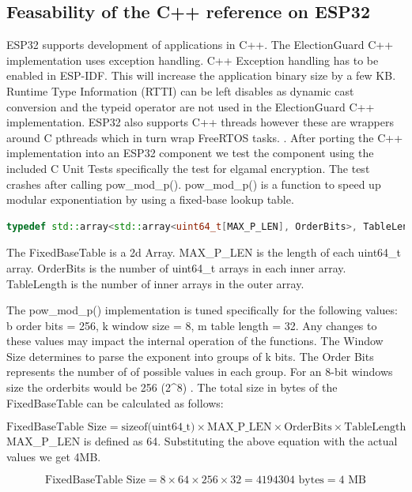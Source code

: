 \subsection{Feasability of the C++ reference on ESP32}
ESP32 supports development of applications in C++. The ElectionGuard C++ implementation uses exception handling. C++ Exception handling has to be enabled in ESP-IDF. This will increase the application binary size by a few KB. Runtime Type Information (RTTI) can be left disables as dynamic cast conversion and the typeid operator are not used in the ElectionGuard C++ implementation. ESP32 also supports C++ threads however these are wrappers around C pthreads which in turn wrap FreeRTOS tasks. \cite{espidf-docs}. After porting the C++ implementation into an ESP32 component we test the component using the included C Unit Tests specifically the test for elgamal encryption. The test crashes after calling pow_mod_p(). pow_mod_p() is a function to speed up modular exponentiation by using a fixed-base lookup table. 

\begin{lstlisting}[language=C++, caption={FixedBaseTable Definition}]
    typedef std::array<std::array<uint64_t[MAX_P_LEN], OrderBits>, TableLength> FixedBaseTable;
\end{lstlisting}

The FixedBaseTable is a 2d Array. MAX_P_LEN is the length of each uint64_t array. OrderBits is the number of uint64_t arrays in each inner array. TableLength is the number of inner arrays in the outer array. 


The pow_mod_p() implementation is tuned specifically for the following values: b order bits = 256, k window size = 8, m table length = 32. Any changes to these values may impact the internal operation of the functions. The Window Size determines to parse the exponent into groups of k bits. The Order Bits represents the number of of possible values in each group. For an 8-bit windows size the orderbits would be 256 (2^8) \cite[22]{eg-spec}. The total size in bytes of the FixedBaseTable can be calculated as follows:

\begin{equation}
    \text{FixedBaseTable Size} = \text{sizeof(uint64\_t)} \times \text{MAX\_P\_LEN} \times \text{OrderBits} \times \text{TableLength}
\end{equation}
MAX_P_LEN is defined as 64. Substituting the above equation with the actual values we get 4MB.

\begin{equation}
    \text{FixedBaseTable Size} = 8 \times 64 \times 256 \times 32 = 4194304 \text{ bytes} = 4 \text{ MB}
\end{equation}

